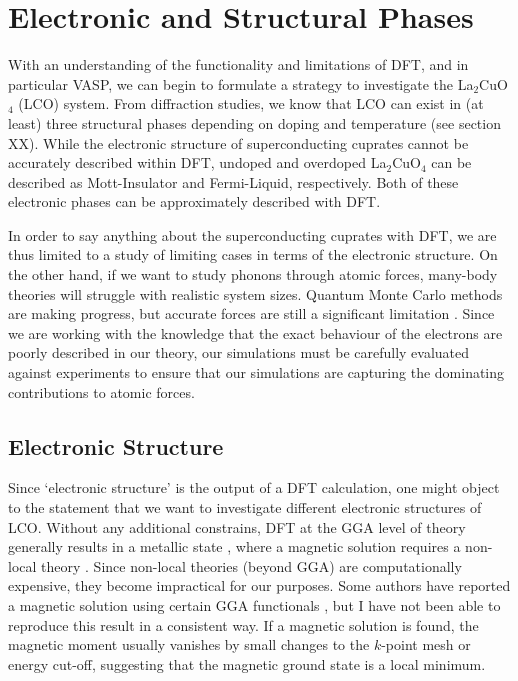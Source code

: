 \section{Electronic and Structural Phases}
With an understanding of the functionality and limitations of DFT, and in particular VASP, we can begin to formulate a strategy to investigate the La$_2$CuO$_4$ (LCO) system. From diffraction studies, we know that LCO can exist in (at least) three structural phases depending on doping and temperature (see section XX). While the electronic structure of superconducting cuprates cannot be accurately described within DFT, undoped and overdoped La$_2$CuO$_4$ can be described as Mott-Insulator and Fermi-Liquid, respectively. Both of these electronic phases can be approximately described with DFT.

In order to say anything about the superconducting cuprates with DFT, we are thus limited to a study of limiting cases in terms of the electronic structure. On the other hand, if we want to study phonons through atomic forces, many-body theories will struggle with realistic system sizes. Quantum Monte Carlo methods are making progress, but accurate forces are still a significant limitation \cite{Wagner2016}. Since we are working with the knowledge that the exact behaviour of the electrons are poorly described in our theory, our simulations must be carefully evaluated against experiments to ensure that our simulations are capturing the dominating contributions to atomic forces.

\subsection{Electronic Structure}
Since `electronic structure' is the output of a DFT calculation, one might object to the statement that we want to investigate different electronic structures of LCO. Without any additional constrains, DFT at the GGA level of theory generally results in a metallic state \cite{Pickett1989}, where a magnetic solution requires a non-local theory \cite{Lane2018}. Since non-local theories (beyond GGA) are computationally expensive, they become impractical for our purposes. Some authors have reported a magnetic solution using certain GGA functionals \cite{Giustino2008}, but I have not been able to reproduce this result in a consistent way. If a magnetic solution is found, the magnetic moment usually vanishes by small changes to the $k$-point mesh or energy cut-off, suggesting that the magnetic ground state is a local minimum.

